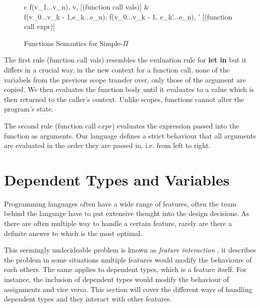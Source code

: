 \documentclass[a4paper,12pt]{report}
\begin{document}
\begin{figure}[H]
  \begin{center}
    \begin{tabular} {c}
      {\langle f(v_1...v_n), \sigma \rangle \Longrightarrow \langle v, \sigma \rangle} [(function call vals)]
      & \\
      {\langle f(v_0...v_{k - 1},e_k...e_n), \sigma \rangle \Longrightarrow \langle f(v_0...v_{k - 1}, e_{k}'...e_n), \sigma' \rangle} [(function call expr)]
    \end{tabular}
  \end{center}
  \caption{Functions Semantics for Simple-$\Pi$}
\end{figure}

\par
The first rule (function call vals) resembles the evaluation rule for 
\textbf{let in} but it differs in a crucial way, in the new context for a 
function call, none of the variabels from the previous scope transfer over, only 
those of the argument are copied. We then evaluates the function body until it 
evaluates to a value which is then returned to the caller's context. Unlike 
scopes, functions cannot alter the program's state. 

\par
The second rule (function call $expr$) evaluates the expression passed into the 
function as arguments. Our language defines a strict behaviour that all 
arguments are evaluated in the order they are passed in, i.e. from left to right. 

\section{Dependent Types and Variables}
Programming languages often have a wide range of features, often the team behind 
the language have to put extensive thought into the design decisions. As there 
are often multiple way to handle a certain feature, rarely are there a definite 
answer to which is the most optimal.

\par
This seemingly undecideable problem is known as \textit{feature interaction} 
\cite{featInteract}, it describes the problem in some situations multiple 
features would modify the behaviours of each others. The same applies to 
dependent types, which is a feature itself. For instance, the inclusion of dependent types 
would modify the behaviour of assignments and vice versa. This section 
will cover the different ways of handling dependent types and they interact with 
other features.
\end{document}
